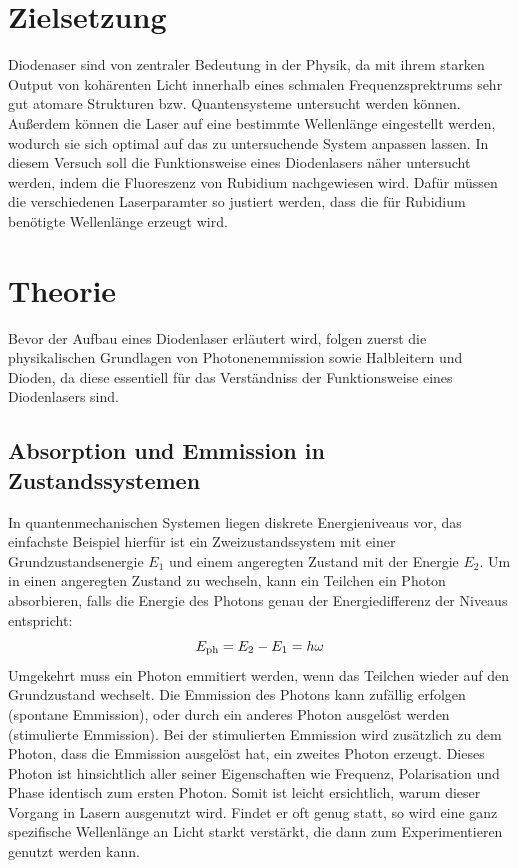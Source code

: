 \section{Zielsetzung}
\label{sec:Zielsetzung}
Diodenaser sind von zentraler Bedeutung in der Physik, da mit ihrem starken Output von kohärenten
Licht innerhalb eines schmalen Frequenzsprektrums sehr gut atomare Strukturen bzw. Quantensysteme
untersucht werden können. Außerdem können die Laser auf eine bestimmte Wellenlänge eingestellt werden, 
wodurch sie sich optimal auf das zu untersuchende System anpassen lassen.
In diesem Versuch soll die Funktionsweise eines Diodenlasers näher untersucht werden, indem die
Fluoreszenz von Rubidium nachgewiesen wird. Dafür müssen die verschiedenen Laserparamter so justiert werden,
dass die für Rubidium benötigte Wellenlänge erzeugt wird.

\section{Theorie}
\label{sec:Theorie}

Bevor der Aufbau eines Diodenlaser erläutert wird, folgen zuerst die physikalischen Grundlagen von Photonenemmission
sowie Halbleitern und Dioden, da diese essentiell für das Verständniss der Funktionsweise eines Diodenlasers sind.

\subsection{Absorption und Emmission in Zustandssystemen}

In quantenmechanischen Systemen liegen diskrete Energieniveaus vor, das einfachste Beispiel hierfür ist ein Zweizustandssystem
mit einer Grundzustandsenergie $E_1$ und einem angeregten Zustand mit der Energie $E_2$. Um in einen
angeregten Zustand zu wechseln, kann ein Teilchen ein Photon absorbieren, falls die Energie des Photons genau der
Energiedifferenz der Niveaus entspricht:
\begin{equation}
    \notag
    E_{\text{ph}} = E_2 - E_1 = h \omega
\end{equation}
Umgekehrt muss ein Photon emmitiert werden, wenn das Teilchen wieder auf den Grundzustand wechselt.
Die Emmission des Photons kann zufällig erfolgen (spontane Emmission), oder durch ein anderes Photon
ausgelöst werden (stimulierte Emmission). Bei der stimulierten Emmission wird zusätzlich zu dem Photon,
dass die Emmission ausgelöst hat, ein zweites Photon erzeugt. Dieses Photon ist hinsichtlich aller seiner
Eigenschaften wie Frequenz, Polarisation und Phase identisch zum ersten Photon. Somit ist leicht
ersichtlich, warum dieser Vorgang in Lasern ausgenutzt wird. Findet er oft genug statt, so wird eine
ganz spezifische Wellenlänge an Licht starkt verstärkt, die dann zum Experimentieren genutzt werden kann.

